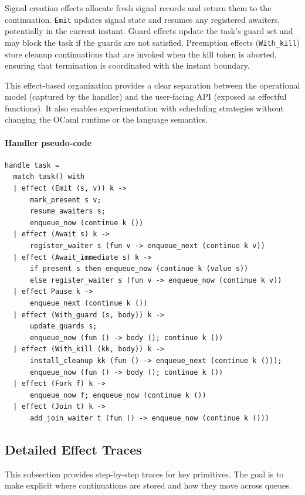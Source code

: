 Signal creation effects allocate fresh signal records and return them to the
continuation. \texttt{Emit} updates signal state and resumes any registered
awaiters, potentially in the current instant. Guard effects update the task's
guard set and may block the task if the guards are not satisfied. Preemption
effects (\texttt{With\_kill}) store cleanup continuations that are invoked when
the kill token is aborted, ensuring that termination is coordinated with the
instant boundary.

This effect-based organization provides a clear separation between the
operational model (captured by the handler) and the user-facing API (exposed as
effectful functions). It also enables experimentation with scheduling
strategies without changing the OCaml runtime or the language semantics.

\paragraph{Handler pseudo-code}
\begin{lstlisting}[style=tempo]
handle task =
  match task() with
  | effect (Emit (s, v)) k ->
      mark_present s v;
      resume_awaiters s;
      enqueue_now (continue k ())
  | effect (Await s) k ->
      register_waiter s (fun v -> enqueue_next (continue k v))
  | effect (Await_immediate s) k ->
      if present s then enqueue_now (continue k (value s))
      else register_waiter s (fun v -> enqueue_now (continue k v))
  | effect Pause k ->
      enqueue_next (continue k ())
  | effect (With_guard (s, body)) k ->
      update_guards s;
      enqueue_now (fun () -> body (); continue k ())
  | effect (With_kill (kk, body)) k ->
      install_cleanup kk (fun () -> enqueue_next (continue k ()));
      enqueue_now (fun () -> body (); continue k ())
  | effect (Fork f) k ->
      enqueue_now f; enqueue_now (continue k ())
  | effect (Join t) k ->
      add_join_waiter t (fun () -> enqueue_now (continue k ()))
\end{lstlisting}

\subsection{Detailed Effect Traces}
This subsection provides step-by-step traces for key primitives. The goal is
to make explicit where continuations are stored and how they move across
queues.

